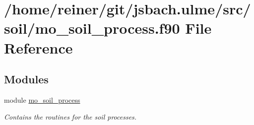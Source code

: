 \hypertarget{mo__soil__process_8f90}{}\section{/home/reiner/git/jsbach.ulme/src/soil/mo\+\_\+soil\+\_\+process.f90 File Reference}
\label{mo__soil__process_8f90}
\subsection*{Modules}
\begin{DoxyCompactItemize}
\item 
module \hyperlink{namespacemo__soil__process}{mo\+\_\+soil\+\_\+process}
\begin{DoxyCompactList}\small\item\em Contains the routines for the soil processes. \end{DoxyCompactList}\end{DoxyCompactItemize}
